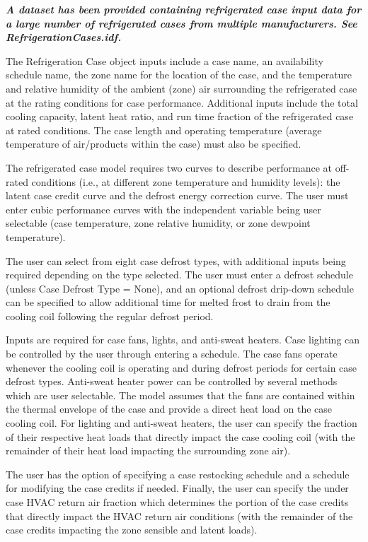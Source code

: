 \textbf{\emph{A dataset has been provided containing refrigerated case input data for a large number of refrigerated cases from multiple manufacturers. See RefrigerationCases.idf.}}

The Refrigeration Case object inputs include a case name, an availability schedule name, the zone name for the location of the case, and the temperature and relative humidity of the ambient (zone) air surrounding the refrigerated case at the rating conditions for case performance. Additional inputs include the total cooling capacity, latent heat ratio, and run time fraction of the refrigerated case at rated conditions. The case length and operating temperature (average temperature of air/products within the case) must also be specified.

The refrigerated case model requires two curves to describe performance at off-rated conditions (i.e., at different zone temperature and humidity levels): the latent case credit curve and the defrost energy correction curve. The user must enter cubic performance curves with the independent variable being user selectable (case temperature, zone relative humidity, or zone dewpoint temperature).

The user can select from eight case defrost types, with additional inputs being required depending on the type selected. The user must enter a defrost schedule (unless Case Defrost Type = None), and an optional defrost drip-down schedule can be specified to allow additional time for melted frost to drain from the cooling coil following the regular defrost period.

Inputs are required for case fans, lights, and anti-sweat heaters. Case lighting can be controlled by the user through entering a schedule. The case fans operate whenever the cooling coil is operating and during defrost periods for certain case defrost types. Anti-sweat heater power can be controlled by several methods which are user selectable. The model assumes that the fans are contained within the thermal envelope of the case and provide a direct heat load on the case cooling coil. For lighting and anti-sweat heaters, the user can specify the fraction of their respective heat loads that directly impact the case cooling coil (with the remainder of their heat load impacting the surrounding zone air).

The user has the option of specifying a case restocking schedule and a schedule for modifying the case credits if needed. Finally, the user can specify the under case HVAC return air fraction which determines the portion of the case credits that directly impact the HVAC return air conditions (with the remainder of the case credits impacting the zone sensible and latent loads).


